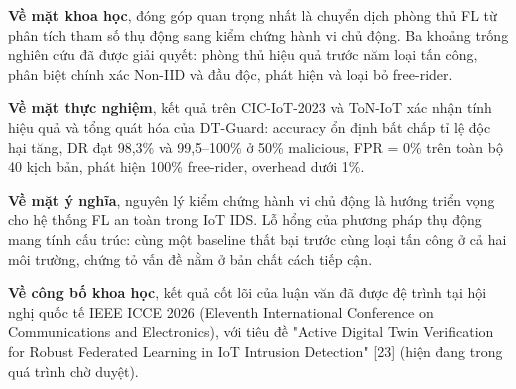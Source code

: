 \textbf{Về mặt khoa học}, đóng góp quan trọng nhất là chuyển dịch phòng thủ FL từ phân tích tham số thụ động sang kiểm chứng hành vi chủ động. Ba khoảng trống nghiên cứu đã được giải quyết: phòng thủ hiệu quả trước năm loại tấn công, phân biệt chính xác Non-IID và đầu độc, phát hiện và loại bỏ free-rider.

\textbf{Về mặt thực nghiệm}, kết quả trên CIC-IoT-2023 và ToN-IoT xác nhận tính hiệu quả và tổng quát hóa của DT-Guard: accuracy ổn định bất chấp tỉ lệ độc hại tăng, DR đạt 98,3\% và 99,5--100\% ở 50\% malicious, FPR = 0\% trên toàn bộ 40 kịch bản, phát hiện 100\% free-rider, overhead dưới 1\%.

\textbf{Về mặt ý nghĩa}, nguyên lý kiểm chứng hành vi chủ động là hướng triển vọng cho hệ thống FL an toàn trong IoT IDS. Lỗ hổng của phương pháp thụ động mang tính cấu trúc: cùng một baseline thất bại trước cùng loại tấn công ở cả hai môi trường, chứng tỏ vấn đề nằm ở bản chất cách tiếp cận.

\textbf{Về công bố khoa học}, kết quả cốt lõi của luận văn đã được đệ trình tại hội nghị quốc tế IEEE ICCE 2026 (Eleventh International Conference on Communications and Electronics), với tiêu đề "Active Digital Twin Verification for Robust Federated Learning in IoT Intrusion Detection" {[}23{]} (hiện đang trong quá trình chờ duyệt).
